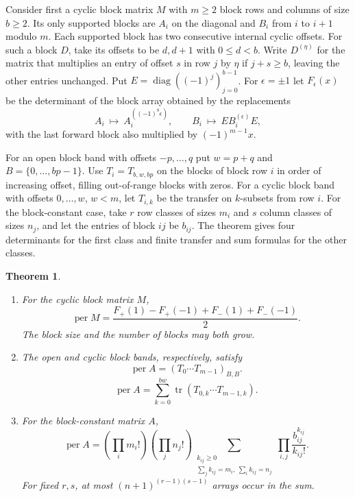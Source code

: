 \documentclass[11pt,reqno]{amsart}
\newtheorem{theorem}{Theorem}[section]
\theoremstyle{remark}
\numberwithin{equation}{section}
\newcommand{\per}{\operatorname{per}}
\newcommand{\tr}{\operatorname{tr}}
\begin{document}
Consider first a cyclic block matrix \(M\) with \(m\ge2\) block
rows and columns of size \(b\ge2\). Its only supported blocks
are \(A_i\) on the diagonal and \(B_i\) from \(i\) to \(i+1\)
modulo \(m\). Each supported block has two consecutive internal
cyclic offsets. For such a block \(D\), take its offsets to be
\(d,d+1\) with \(0\le d<b\). Write \(D^{(\eta)}\) for the matrix
that multiplies an entry of offset \(s\) in row \(j\) by \(\eta\)
if \(j+s\ge b\), leaving the other entries unchanged.
Put \(E=\operatorname{diag}((-1)^j)_{j=0}^{b-1}\).
For \(\epsilon=\pm1\) let \(F_\epsilon(x)\) be the determinant
of the block array obtained by the replacements
\[
 A_i\ \longmapsto\ A_i^{((-1)^b\epsilon)},\qquad
 B_i\ \longmapsto\ E B_i^{(\epsilon)}E,
\]
with the last forward block also multiplied by \((-1)^{m-1}x\).

For an open block band with offsets \(-p,\ldots,q\) put
\(w=p+q\) and \(B=\{0,\ldots,bp-1\}\). Use
\(T_i=T_{b,w,bp}\) on the blocks of block row \(i\) in order
of increasing offset, filling out-of-range blocks with zeros.
For a cyclic block band with offsets \(0,\ldots,w\), \(w<m\),
let \(T_{i,k}\) be the transfer on \(k\)-subsets from row \(i\).
For the block-constant case, take \(r\) row classes of sizes
\(m_i\) and \(s\) column classes of sizes \(n_j\), and let the
entries of block \(ij\) be \(b_{ij}\).
The theorem gives four determinants for the first class
and finite transfer and sum formulas for the other classes.

\begin{theorem}\label{thm:block}
\leavevmode
\begin{enumerate}
\item For the cyclic block matrix \(M\),
\begin{equation}\label{eq:block-four-det}
 \per M=
 \frac{F_+(1)-F_+(-1)+F_-(1)+F_-(-1)}{2}.
\end{equation}
The block size and the number of blocks may both grow.

\item The open and cyclic block bands, respectively, satisfy
\begin{equation}\label{eq:block-open}
 \per A=(T_0\cdots T_{m-1})_{B,B}.
\end{equation}
\begin{equation}\label{eq:block-cyclic}
 \per A=\sum_{k=0}^{bw}\tr(T_{0,k}\cdots T_{m-1,k}).
\end{equation}

\item For the block-constant matrix \(A\),
\begin{equation}\label{eq:constant-blocks}
 \per A=\left(\prod_i m_i!\right)\left(\prod_j n_j!\right)
 \sum_{\substack{k_{ij}\geq0\\\sum_j k_{ij}=m_i,\ \sum_i k_{ij}=n_j}}
             \prod_{i,j}\frac{b_{ij}^{k_{ij}}}{k_{ij}!}.
\end{equation}
For fixed \(r,s\), at most \((n+1)^{(r-1)(s-1)}\) arrays
occur in the sum.
\end{enumerate}
\end{theorem}
\end{document}
